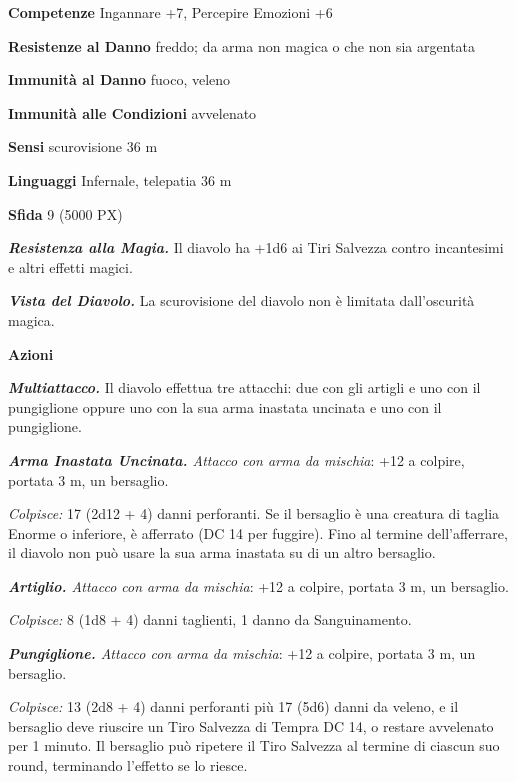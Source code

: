 \begin{multicols}{2}
\textbf{Competenze} Ingannare +7, Percepire Emozioni +6

\textbf{Resistenze al Danno} freddo; da arma non magica o che non sia argentata

\textbf{Immunità al Danno} fuoco, veleno

\textbf{Immunità alle Condizioni} avvelenato

\textbf{Sensi} scurovisione 36 m

\textbf{Linguaggi} Infernale, telepatia 36 m

\textbf{Sfida} 9 (5000 PX)

\textit{\textbf{Resistenza alla Magia.}} Il diavolo ha +1d6 ai Tiri Salvezza contro incantesimi e altri effetti magici.

\textit{\textbf{Vista del Diavolo.}} La scurovisione del diavolo non è limitata dall'oscurità magica.

\textbf{Azioni}

\textit{\textbf{Multiattacco.}} Il diavolo effettua tre attacchi: due con gli artigli e uno con il pungiglione oppure uno con la sua arma inastata uncinata e uno con il pungiglione.

\textit{\textbf{Arma Inastata Uncinata.} Attacco con arma da mischia}: +12 a colpire, portata 3 m, un bersaglio.

\textit{Colpisce:} 17 (2d12 + 4) danni perforanti. Se il bersaglio è una creatura di taglia Enorme o inferiore, è afferrato (DC 14 per fuggire). Fino al termine dell'afferrare, il diavolo non può usare la sua arma inastata su di un altro bersaglio.

\textit{\textbf{Artiglio.} Attacco con arma da mischia}: +12 a colpire, portata 3 m, un bersaglio.

\textit{Colpisce:} 8 (1d8 + 4) danni taglienti, 1 danno da Sanguinamento.

\textit{\textbf{Pungiglione.} Attacco con arma da mischia}: +12 a colpire, portata 3 m, un bersaglio.

\textit{Colpisce:} 13 (2d8 + 4) danni perforanti più 17 (5d6) danni da veleno, e il bersaglio deve riuscire un Tiro Salvezza di Tempra DC 14, o restare avvelenato per 1 minuto. Il bersaglio può ripetere il Tiro Salvezza al termine di ciascun suo round, terminando l'effetto se lo riesce.


\end{multicols}
